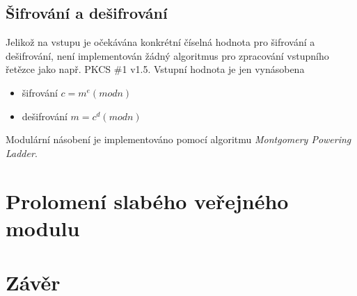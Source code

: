 \documentclass[a4paper,11pt]{article}
\begin{document}
\subsection*{Šifrování a dešifrování}
Jelikož na vstupu je očekávána konkrétní číselná hodnota pro šifrování a dešifrování,
není implementován žádný algoritmus pro zpracování vstupního řetězce jako např. PKCS \#1 v1.5.
Vstupní hodnota je jen vynásobena
\begin{itemize}
\item šifrování $c = m^e (mod n)$
\item dešifrování $m = c^d (mod n)$
\end{itemize}

Modulární násobení je implementováno pomocí algoritmu \textit{Montgomery Powering Ladder}.

\section{Prolomení slabého veřejného modulu}

\section{Závěr}
\end{document}
